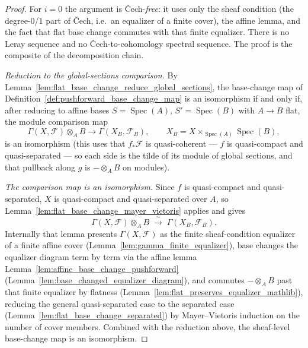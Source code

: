 \begin{proof}
  For \(i = 0\) the argument is {\v C}ech-\emph{free}: it uses only the sheaf
  condition (the degree-\(0\)/\(1\) part of {\v C}ech, i.e.\ an equalizer of a finite
  cover), the affine lemma, and the fact that flat base change commutes with that
  finite equalizer. There is no Leray sequence and no {\v C}ech-to-cohomology spectral
  sequence. The proof is the composite of the decomposition chain.

  \medskip
  \emph{Reduction to the global-sections comparison.} By
  Lemma~\ref{lem:flat_base_change_reduce_global_sections}, the base-change map of
  Definition~\ref{def:pushforward_base_change_map} is an isomorphism if and only if,
  after reducing to affine bases \(S = \operatorname{Spec}(A)\),
  \(S' = \operatorname{Spec}(B)\) with \(A \to B\) flat, the module comparison map
  \[
    \Gamma(X, \mathcal{F}) \otimes_A B \longrightarrow \Gamma(X_B, \mathcal{F}_B),
    \qquad X_B = X \times_{\operatorname{Spec}(A)} \operatorname{Spec}(B),
  \]
  is an isomorphism (this uses that \(f_*\mathcal{F}\) is quasi-coherent — \(f\) is
  quasi-compact and quasi-separated — so each side is the tilde of its module of
  global sections, and that pullback along \(g\) is \(- \otimes_A B\) on modules).

  \medskip
  \emph{The comparison map is an isomorphism.} Since \(f\) is quasi-compact and
  quasi-separated, \(X\) is quasi-compact and quasi-separated over \(A\), so
  Lemma~\ref{lem:flat_base_change_mayer_vietoris} applies and gives
  \[
    \Gamma(X, \mathcal{F}) \otimes_A B \;\xrightarrow{\ \sim\ }\; \Gamma(X_B, \mathcal{F}_B).
  \]
  Internally that lemma presents \(\Gamma(X,\mathcal{F})\) as the finite
  sheaf-condition equalizer of a finite affine cover
  (Lemma~\ref{lem:gamma_finite_equalizer}), base changes the equalizer diagram term by
  term via the affine lemma Lemma~\ref{lem:affine_base_change_pushforward}
  (Lemma~\ref{lem:base_changed_equalizer_diagram}), and commutes \(- \otimes_A B\)
  past that finite equalizer by flatness
  (Lemma~\ref{lem:flat_preserves_equalizer_mathlib}), reducing the general
  quasi-separated case to the separated case
  (Lemma~\ref{lem:flat_base_change_separated}) by Mayer--Vietoris induction on the
  number of cover members. Combined with the reduction above, the sheaf-level
  base-change map is an isomorphism.
\end{proof}

